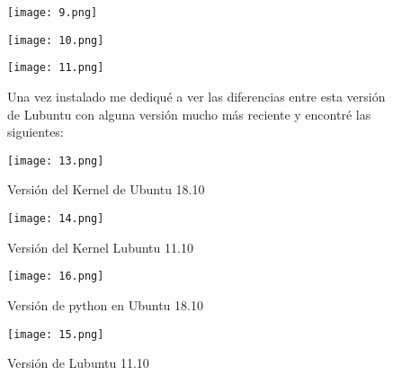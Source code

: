 \documentclass[11pt, a4paper]{report}
\begin{document}
  \begin{figure}[!ht] 
    \begin{center}  
      \texttt{[image: 9.png]} 
      \caption{} 
    \end{center} 
  \end{figure}

  \begin{figure}[!ht] 
    \begin{center}  
      \texttt{[image: 10.png]} 
      \caption{} 
    \end{center} 
  \end{figure}

  \begin{figure}[!ht] 
    \begin{center}  
      \texttt{[image: 11.png]} 
      \caption{} 
    \end{center}

    Una vez instalado me dediqué a ver las diferencias entre esta versión de
    Lubuntu con alguna versión mucho más reciente y encontré las siguientes: \\
    
  \end{figure}

    \begin{figure}[!ht] 
    \begin{center}  
      \texttt{[image: 13.png]} 
      \caption{Versión del Kernel de Ubuntu 18.10} 
    \end{center} 
  \end{figure}

  \begin{figure}[!ht] 
    \begin{center}  
      \texttt{[image: 14.png]} 
      \caption{Versión del Kernel Lubuntu 11.10} 
    \end{center}
  \end{figure}

      \begin{figure}[!ht] 
    \begin{center}  
      \texttt{[image: 16.png]} 
      \caption{Versión de python en Ubuntu 18.10} 
    \end{center} 
  \end{figure}

  \begin{figure}[!ht] 
    \begin{center}  
      \texttt{[image: 15.png]} 
      \caption{Versión de Lubuntu 11.10} 
    \end{center}
     \end{figure}
\end{document}
